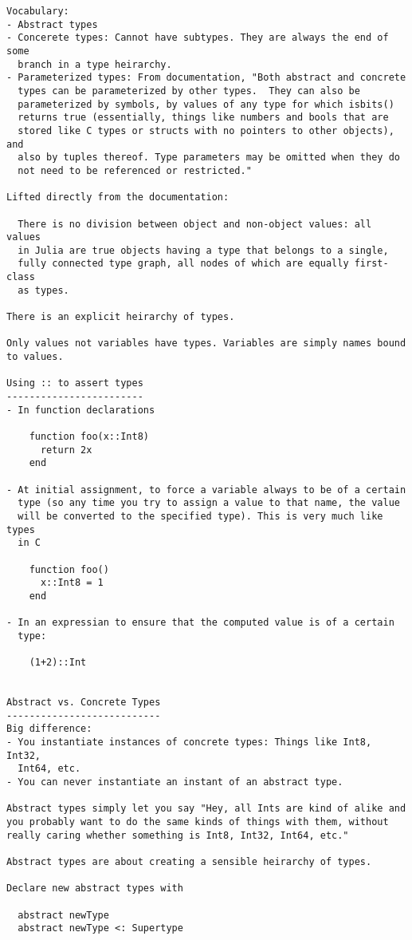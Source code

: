 \documentclass[12pt]{article}
\theoremstyle{plain}
\theoremstyle{definition}
\theoremstyle{remark}
\begin{document}
\begin{lstlisting}
Vocabulary:
- Abstract types
- Concerete types: Cannot have subtypes. They are always the end of some
  branch in a type heirarchy.
- Parameterized types: From documentation, "Both abstract and concrete
  types can be parameterized by other types.  They can also be
  parameterized by symbols, by values of any type for which isbits()
  returns true (essentially, things like numbers and bools that are
  stored like C types or structs with no pointers to other objects), and
  also by tuples thereof. Type parameters may be omitted when they do
  not need to be referenced or restricted."

Lifted directly from the documentation:

  There is no division between object and non-object values: all values
  in Julia are true objects having a type that belongs to a single,
  fully connected type graph, all nodes of which are equally first-class
  as types.

There is an explicit heirarchy of types.

Only values not variables have types. Variables are simply names bound
to values.

Using :: to assert types
------------------------
- In function declarations

    function foo(x::Int8)
      return 2x
    end

- At initial assignment, to force a variable always to be of a certain
  type (so any time you try to assign a value to that name, the value
  will be converted to the specified type). This is very much like types
  in C

    function foo()
      x::Int8 = 1
    end

- In an expressian to ensure that the computed value is of a certain
  type:

    (1+2)::Int


Abstract vs. Concrete Types
---------------------------
Big difference:
- You instantiate instances of concrete types: Things like Int8, Int32,
  Int64, etc.
- You can never instantiate an instant of an abstract type.

Abstract types simply let you say "Hey, all Ints are kind of alike and
you probably want to do the same kinds of things with them, without
really caring whether something is Int8, Int32, Int64, etc."

Abstract types are about creating a sensible heirarchy of types.

Declare new abstract types with

  abstract newType
  abstract newType <: Supertype


\end{lstlisting}
\end{document}

